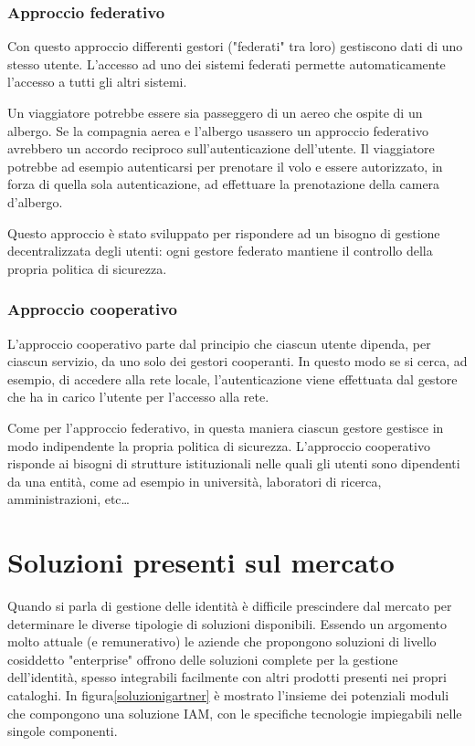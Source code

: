 \subsubsection{Approccio federativo}

Con questo approccio differenti gestori ("federati" tra loro) gestiscono dati di
uno stesso utente. L'accesso ad uno dei sistemi federati permette
automaticamente l'accesso a tutti gli altri sistemi.

Un viaggiatore potrebbe essere sia passeggero di un aereo che ospite di un
albergo. Se la compagnia aerea e l'albergo usassero un approccio federativo
avrebbero un accordo reciproco sull'autenticazione dell'utente. Il viaggiatore
potrebbe ad esempio autenticarsi per prenotare il volo e essere autorizzato, in
forza di quella sola autenticazione, ad effettuare la prenotazione della camera
d'albergo.

Questo approccio è stato sviluppato per rispondere ad un bisogno di gestione
decentralizzata degli utenti: ogni gestore federato mantiene il controllo della
propria politica di sicurezza.

\subsubsection{Approccio cooperativo}

L'approccio cooperativo parte dal principio che ciascun utente dipenda, per
ciascun servizio, da uno solo dei gestori cooperanti. In questo modo se si
cerca, ad esempio, di accedere alla rete locale, l'autenticazione viene
effettuata dal gestore che ha in carico l'utente per l'accesso alla rete.

Come per l'approccio federativo, in questa maniera ciascun gestore gestisce in
modo indipendente la propria politica di sicurezza. L'approccio cooperativo
risponde ai bisogni di strutture istituzionali nelle quali gli utenti sono 
dipendenti da una entità, come ad esempio in università, laboratori di ricerca,
amministrazioni, etc\ldots


\section{Soluzioni presenti sul mercato}
Quando si parla di gestione delle identità è difficile prescindere dal mercato
per determinare le diverse tipologie di soluzioni disponibili.
Essendo un argomento molto attuale (e remunerativo) le aziende che propongono
soluzioni di livello cosiddetto "enterprise" offrono delle soluzioni complete
per la gestione dell'identità, spesso integrabili facilmente con altri prodotti
presenti nei propri cataloghi.
In figura\ref{soluzionigartner} è mostrato l'insieme dei potenziali moduli che
compongono una soluzione IAM, con le specifiche tecnologie impiegabili nelle
singole componenti.

